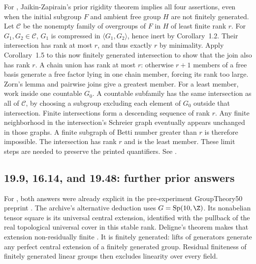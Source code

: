 \label{prior:20.11}
For , Jaikin-Zapirain's prior rigidity theorem
\cite{jaikin} implies all four assertions, even when
the initial subgroup \(F\) and ambient free group \(H\)
are not finitely generated. Let \(\mathcal C\) be the
nonempty family of overgroups of \(F\) in \(H\) of least
finite rank \(r\).
For \(G_1,G_2\in\mathcal C\), \(G_1\) is compressed in
\(\langle G_1,G_2\rangle\), hence inert by Corollary~1.2.
Their intersection has rank at most \(r\), and thus exactly
\(r\) by minimality. Apply Corollary~1.5 to this now
finitely generated intersection to show that the join
also has rank \(r\).
A chain union has rank at most \(r\): otherwise \(r+1\)
members of a free basis generate a free factor lying
in one chain member, forcing its rank too large.
Zorn's lemma and pairwise joins give a greatest member.
For a least member, work inside one countable \(G_0\).
A countable subfamily has the same intersection as
all of \(\mathcal C\), by choosing a subgroup excluding
each element of \(G_0\) outside that intersection.
Finite intersections form a descending sequence of
rank \(r\). Any finite neighborhood in the intersection's
Schreier graph eventually appears unchanged in those
graphs. A finite subgraph of Betti number greater than
\(r\) is therefore impossible. The intersection has
rank \(r\) and is the least member. These limit steps
are needed to preserve the printed quantifiers.
See .

\subsection{19.9, 16.14, and 19.48: further prior answers}

\label{prior:19.9}
For , both answers were already explicit in
the pre-experiment GroupTheory50 preprint
\cite{proofforum-tensor}. The archive's alternative
deduction uses \(G=\operatorname{Sp}(10,\Z)\).
Its nonabelian tensor square is its universal central
extension, identified with the pullback of the real
topological universal cover in this stable rank.
Deligne's theorem makes that extension non-residually
finite \cite{deligne,benson-symplectic}.
It is finitely generated: lifts of generators generate
any perfect central extension of a finitely generated
group. Residual finiteness of finitely generated linear
groups then excludes linearity over every field.

